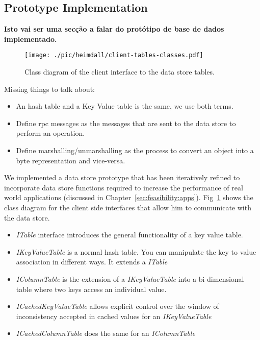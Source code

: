 
\subsection{Prototype Implementation}
\textbf{Isto vai ser uma secção a falar do protótipo de base de dados implementado.} 
\begin{figure}[ht]
  \centering
  \texttt{[image: ./pic/heimdall/client-tables-classes.pdf]}
  \caption{Class diagram of the client interface to the data store tables.}
\label{fig:design:class-diagram}
\end{figure}

Missing things to talk about: 
\begin{itemize}
\item An hash table and a Key Value table is the same, we use both terms. 
\item Define \gls{rpc} messages as the messages that are sent to the data store to perform an operation. 
\item Define marshalling/unmarshalling as the process to convert an object into a byte representation and vice-versa. 
\end{itemize}

We implemented a  data store prototype that has been iteratively refined to incorporate data store functions required to increase the performance of real world applications (discussed in Chapter~\ref{sec:feasibility:apps}).  
Fig~\ref{fig:design:class-diagram} shows the class diagram for the client side interfaces that allow him to communicate with the  data store.  
\begin{itemize}
\item \emph{ITable} interface introduces the general functionality of a key value table.
\item \emph{IKeyValueTable}  is a normal hash table. You can manipulate the key to value association in different ways. It extends a \emph{ITable}
\item \emph{IColumnTable} is the extension of a \emph{IKeyValueTable} into a bi-dimensional table where two keys access an individual value. 
\item \emph{ICachedKeyValueTable} allows explicit control over the window of inconsistency accepted in cached values for an \emph{IKeyValueTable} 
\item \emph{ICachedColumnTable} does the same for an \emph{IColumnTable} 
\end{itemize}

